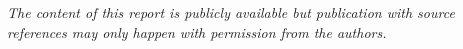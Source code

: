 \begin{nopagebreak}
\begin{multicols}{2}

    \vfill
    \columnbreak


  \end{multicols}
  \vfill

  \begin{center}
    \textit{The content of this report is publicly available but
    publication with source references may only happen with permission from
    the authors.}
  \end{center}
\end{nopagebreak}

